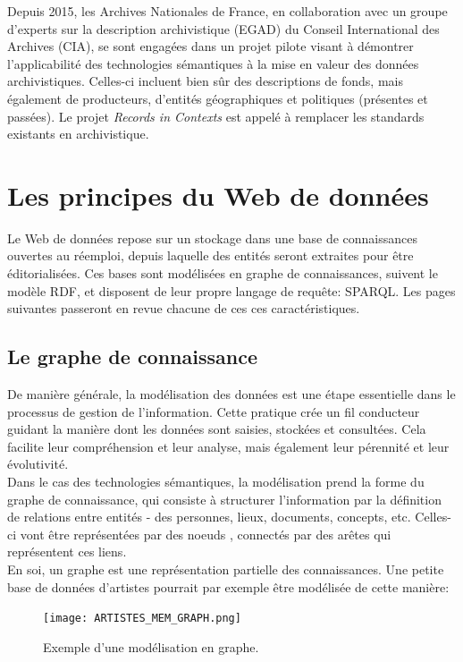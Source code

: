 \documentclass[a4paper,12pt,twoside]{book}
\begin{document}
Depuis 2015, les Archives Nationales de France, en collaboration avec un groupe d'experts sur la description archivistique (EGAD) du Conseil International des Archives (CIA), se sont engagées dans un projet pilote visant à démontrer l'applicabilité des technologies sémantiques à la mise en valeur des données archivistiques. Celles-ci incluent bien sûr des descriptions de fonds, mais également de producteurs, d'entités géographiques et politiques (présentes et passées). Le projet \textit{Records in Contexts} est appelé à remplacer les standards existants en archivistique.\\




\chapter{Les principes du Web de données}

Le Web de données repose sur un stockage dans une base de connaissances ouvertes au réemploi, depuis laquelle des entités seront extraites pour être éditorialisées. Ces bases sont modélisées en graphe de connaissances, suivent le modèle RDF, et disposent de leur propre langage de requête: SPARQL. Les pages suivantes passeront en revue chacune de ces ces caractéristiques. 


\section{Le graphe de connaissance}
De manière générale, la modélisation des données est une étape essentielle dans le processus de gestion de l'information. Cette pratique crée un fil conducteur guidant la manière dont les données sont saisies, stockées et consultées. Cela facilite leur compréhension et leur analyse, mais également leur pérennité et leur évolutivité.\\

Dans le cas des technologies sémantiques, la modélisation prend la forme du graphe de connaissance, qui consiste à structurer l'information par la définition de relations entre entités - des personnes, lieux, documents, concepts, etc. Celles-ci vont être représentées par des \og noeuds \fg, connectés par des \og arêtes \fg{} qui représentent ces liens.\\

En soi, un graphe est une représentation partielle des connaissances. Une petite base de données d'artistes pourrait par exemple être modélisée de cette manière:
\newpage
\begin{figure}[h]
    \centering
    \texttt{[image: ARTISTES\_MEM\_GRAPH.png]}
    \caption{Exemple d'une modélisation en graphe.}
    \label{fig:enter-label}
\end{figure}
\end{document}
